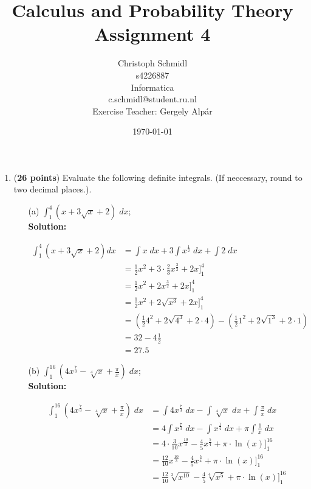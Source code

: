 \documentclass[a4paper]{article}
\title{Calculus and Probability Theory\\ Assignment 4}
\author{Christoph Schmidl\\
s4226887\\
Informatica\\
c.schmidl@student.ru.nl\\
Exercise Teacher: Gergely Alp\'{a}r}
\date{\today}
\begin{document}
\maketitle

\begin{enumerate}

\item (\textbf{26 points}) Evaluate the following definite integrals. (If neccessary, round to two decimal places.).\\

\begin{enumerate}
	\item[(a)] $\int_1^4(x + 3 \sqrt{x} + 2) \; dx$;\\
	\textbf{Solution:}
	
\begin{align*}
	\int_1^4(x + 3 \sqrt{x} + 2)dx &= \int x \; dx + 3 \int x^\frac{1}{2} \; dx + \int 2 \; dx \\
	&= \frac{1}{2}x^2 + 3 \cdot \frac{2}{3}x^\frac{3}{2} + 2x \Bigg]_1^4 \\
	&= \frac{1}{2}x^2 + 2x^\frac{3}{2} + 2x \Bigg]_1^4\\
	&= \frac{1}{2}x^2 + 2 \sqrt{x^3} + 2x \Bigg]_1^4 \\
	&= (\frac{1}{2}4^2 + 2 \sqrt{4^3} + 2 \cdot 4) - (\frac{1}{2}1^2 + 2 \sqrt{1^3} + 2 \cdot 1) \\
	&= 32 - 4 \frac{1}{2} \\
	&= 27.5
\end{align*}	
	
\newpage	
	
	
	\item[(b)] $\int_1^{16}(4x^{\frac{7}{3}} - \sqrt[4]{x} + \frac{\pi}{x}) \; dx$;\\
	\textbf{Solution:}
	
\begin{align*}
	\int_1^{16} (4x^\frac{7}{3} - \sqrt[4]{x} + \frac{\pi}{x}) \; dx &= \int 4x^\frac{7}{3} \; dx - \int \sqrt[4]{x} \; dx + \int \frac{\pi}{x} \; dx \\
	&= 4 \int x^\frac{7}{3} \; dx - \int x^\frac{1}{4} \; dx + \pi \int \frac{1}{x} \; dx \\
	&= 4 \cdot \frac{3}{10}x^\frac{10}{3} - \frac{4}{5}x^\frac{5}{4} + \pi \cdot \ln(x) \Bigg]_1^{16} \\
	&= \frac{12}{10}x^\frac{10}{3} - \frac{4}{5}x^\frac{5}{4} + \pi \cdot \ln(x) \Bigg]_1^{16} \\
	&= \frac{12}{10} \sqrt[3]{x^{10}} - \frac{4}{5} \sqrt[4]{x^5} + \pi \cdot \ln(x) \Bigg]_1^{16} \\
\end{align*}	
	

\end{enumerate}
\end{enumerate}
\end{document}
